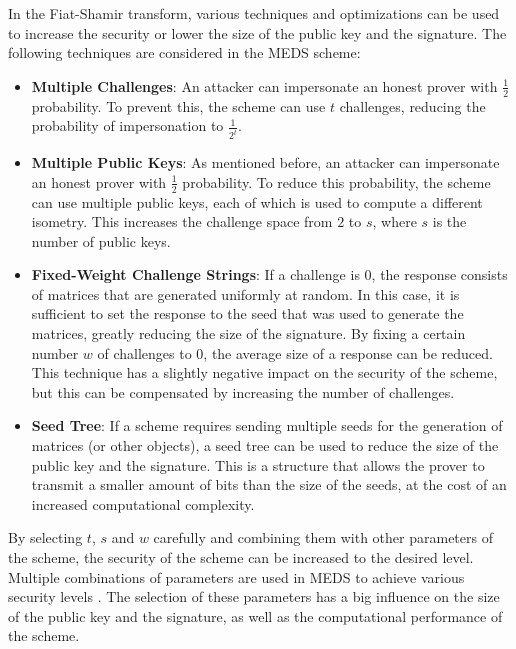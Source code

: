 \documentclass[11pt,a4paper]{report}
\theoremstyle{definition}
\begin{document}
In the Fiat-Shamir transform, various techniques and optimizations can be used to increase the security or lower the size of the public key and the signature. The following techniques are considered in the MEDS scheme:
\begin{itemize}
  \item \textbf{Multiple Challenges}: An attacker can impersonate an honest prover with $\frac{1}{2}$ probability. To prevent this, the scheme can use $t$ challenges, reducing the probability of impersonation to $\frac{1}{2^t}$.
  \item \textbf{Multiple Public Keys}: As mentioned before, an attacker can impersonate an honest prover with $\frac{1}{2}$ probability. To reduce this probability, the scheme can use multiple public keys, each of which is used to compute a different isometry. This increases the challenge space from $2$ to $s$, where $s$ is the number of public keys.
  \item \textbf{Fixed-Weight Challenge Strings}: If a challenge is 0, the response consists of matrices that are generated uniformly at random. In this case, it is sufficient to set the response to the seed that was used to generate the matrices, greatly reducing the size of the signature. By fixing a certain number $w$ of challenges to 0, the average size of a response can be reduced. This technique has a slightly negative impact on the security of the scheme, but this can be compensated by increasing the number of challenges.
  \item \textbf{Seed Tree}: If a scheme requires sending multiple seeds for the generation of matrices (or other objects), a seed tree can be used to reduce the size of the public key and the signature. This is a structure that allows the prover to transmit a smaller amount of bits than the size of the seeds, at the cost of an increased computational complexity.
\end{itemize}

By selecting $t$, $s$ and $w$ carefully and combining them with other parameters of the scheme, the security of the scheme can be increased to the desired level. Multiple combinations of parameters are used in MEDS to achieve various security levels \cite{chou2023meds}. The selection of these parameters has a big influence on the size of the public key and the signature, as well as the computational performance of the scheme.
\end{document}
